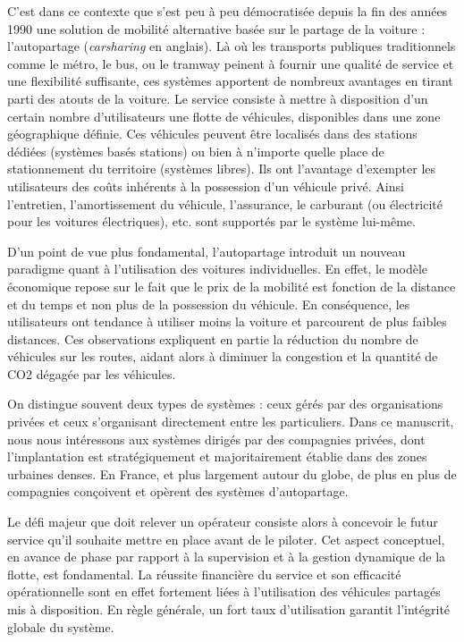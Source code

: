 \medskip
C'est dans ce contexte que s'est peu à peu démocratisée depuis la fin des années 1990 une solution de mobilité alternative basée sur le partage de la voiture : l'autopartage (\emph{carsharing} en anglais).
Là où les transports publiques traditionnels comme le métro, le bus, ou le tramway peinent à fournir une qualité de service et une flexibilité suffisante, ces systèmes apportent de nombreux avantages en tirant parti des atouts de la voiture.
Le service consiste à mettre à disposition d'un certain nombre d'utilisateurs une flotte de véhicules, disponibles dans une zone géographique définie.
Ces véhicules peuvent être localisés dans des stations dédiées (systèmes basés stations) ou bien à n'importe quelle place de stationnement du territoire (systèmes libres).
Ils ont l'avantage d'exempter les utilisateurs des coûts inhérents à la possession d'un véhicule privé.
Ainsi l'entretien, l'amortissement du véhicule, l'assurance, le carburant (ou électricité pour les voitures électriques), etc. sont supportés par le système lui-même.

\medskip
D'un point de vue plus fondamental, l'autopartage introduit un nouveau paradigme quant à l'utilisation des voitures individuelles.
En effet, le modèle économique repose sur le fait que le prix de la mobilité est fonction de la distance et du temps et non plus de la possession du véhicule.
En conséquence, les utilisateurs ont tendance à utiliser moins la voiture et parcourent de plus faibles distances.
Ces observations expliquent en partie la réduction du nombre de véhicules sur les routes, aidant alors à diminuer la congestion et la quantité de CO2 dégagée par les véhicules.

\medskip
On distingue souvent deux types de systèmes : ceux gérés par des organisations privées et ceux s'organisant directement entre les particuliers.
Dans ce manuscrit, nous nous intéressons aux systèmes dirigés par des compagnies privées, dont l'implantation est stratégiquement et majoritairement établie dans des zones urbaines denses.
En France, et plus largement autour du globe, de plus en plus de compagnies conçoivent et opèrent des systèmes d'autopartage.

Le défi majeur que doit relever un opérateur consiste alors à concevoir le futur service qu’il souhaite mettre en place avant de le piloter.
Cet aspect conceptuel, en avance de phase par rapport à la supervision et à la gestion dynamique de la flotte, est fondamental.
La réussite financière du service et son efficacité opérationnelle sont en effet fortement liées à l’utilisation des véhicules partagés mis à disposition.
En règle générale, un fort taux d’utilisation garantit l’intégrité globale du système.

